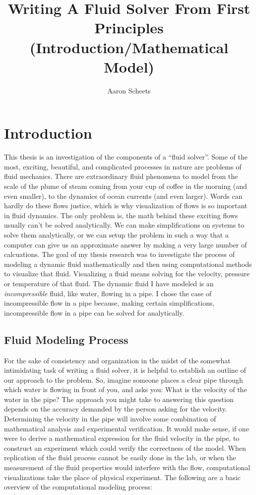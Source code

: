 \documentclass[twocolumn,12pth]{article}
\title{Writing A Fluid Solver From First Principles (Introduction/Mathematical Model)}
\author{Aaron Scheets}
\begin{document}

\maketitle

\section{Introduction}

This thesis is an investigation of the components of a ``fluid solver''.
Some of the most, exciting, beautiful, and complicated processes in nature are problems of fluid mechanics.
There are extraordinary fluid phenomena to model from the scale of the plume of steam coming from your cup of coffee in the morning (and even smaller), to the dynamics of ocean currents (and even larger).
Words can hardly do these flows justice, which is why visualization of flows is so important in fluid dynamics.
The only problem is, the math behind these exciting flows usually can't be solved analytically. 
We can make simplifications on systems to solve them analytically, or we can setup the problem in such a way that a computer can give us an approximate answer by making a very large number of calcuations.
The goal of my thesis research was to investigate the process of modeling a dynamic fluid mathematically and then using computational methods to visualize that fluid.
Visualizing a fluid means solving for the velocity, pressure or temperature of that fluid.
The dynamic fluid I have modeled is an \textit{incompressible} fluid, like water, flowing in a pipe. 
I chose the case of incompressible flow in a pipe because, making certain simplifications, incompressible flow in a pipe can be solved for analytically. 

\subsection{Fluid Modeling Process}

For the sake of consistency and organization in the midst of the somewhat intimidating task of writing a fluid solver, it is helpful to establish an outline of our approach to the problem.
So, imagine someone places a clear pipe through which water is flowing in front of you, and asks you: What is the velocity of the water in the pipe?
The approach you might take to answering this question depends on the accuracy demanded by the person asking for the velocity.
Determining the velocity in the pipe will involve some combination of mathematical analysis and experimental verification.
It would make sense, if one were to derive a mathematical expression for the fluid velocity in the pipe, to construct an experiment which could verify the correctness of the model.
When replication of the fluid process cannot be easily done in the lab, or when the measurement of the fluid properties would interfere with the flow, computational visualizations take the place of physical experiment.
The following are a basic overview of the computational modeling process:
\vspace{2mm}
\end{document}
